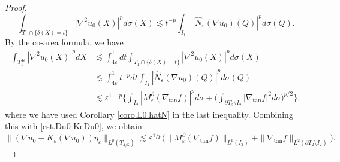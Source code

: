 \documentclass[reqno,12pt]{amsart} %
\theoremstyle{definition}
\theoremstyle{remark}
\numberwithin{equation}{section}
\newcommand{\e}{\varepsilon}
\begin{document}
\begin{proof}
\begin{equation}
    \int_{ T_1 \cap \{\delta(X) = t\} } |\nabla^2 u_0(X)|^p d\sigma(X) \lesssim t^{-p} \int_{I_1} |\widehat{N}_\e(\nabla u_0)(Q)|^p d\sigma(Q).
\end{equation}
By the co-area formula, we have
\begin{equation}\label{est.D2u0.coarea}
\begin{aligned}
    \int_{T_1^{4\e}} |\nabla^2 u_0(X)|^p dX 
    & \lesssim \int_{4\e}^{1} dt \int_{T_1 \cap \{ \delta(X) = t\} } |\nabla^2 u_0(X)|^p d\sigma(X) \\
    & \lesssim \int_{4\e}^{1} t^{-p} dt \int_{I_1 } |\widehat{N}_\e(\nabla u_0)(Q)|^p d\sigma(Q) \\
    & \lesssim \e^{1-p} \bigg\{ \int_{I_2} |M_\e^\partial(\nabla_{\tan} f)|^p d\sigma + \bigg( \int_{\partial T_{2} \setminus I_{2} } |\nabla_{\tan} f|^2 d\sigma \bigg)^{p/2} \bigg\},
\end{aligned}
\end{equation}
where we have used Corollary \ref{coro.L0.hatN} in the last inequality.
Combining this with \eqref{est.Du0-KeDu0}, we obtain
\begin{equation}\label{est.Du0-KDu0.final}
    \| (\nabla u_0 - K_\e(\nabla u_0)) \eta_\e \|_{L^p(T_{4/5})}  \lesssim \e^{1/p} \big( \| M_\e^\partial(\nabla_{\tan} f) \|_{L^p(I_2)} + \| \nabla_{\tan} f \|_{L^2(\partial T_2 \setminus I_2)} \big).
\end{equation}


\end{proof}
\end{document}
